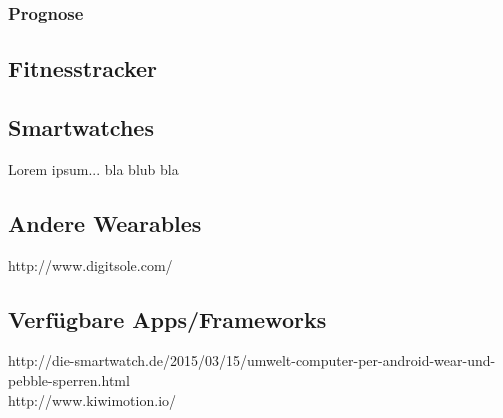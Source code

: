 \subsubsection{Prognose}
\subsection{Fitnesstracker}
\newpage

\subsection{Smartwatches}
Lorem ipsum... bla blub bla
\newpage



\subsection{Andere Wearables}
http://www.digitsole.com/

\subsection{Verfügbare Apps/Frameworks}
http://die-smartwatch.de/2015/03/15/umwelt-computer-per-android-wear-und-pebble-sperren.html\\
http://www.kiwimotion.io/